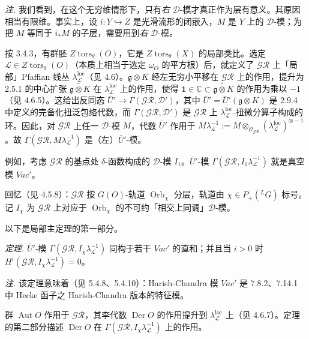  \emph{注.} 我们看到，在这个无穷维情形下，只有\emph{右} $\mathcal{D}$-模才真正作为层有意义。其原因相当有限维。事实上，设 $i:Y\hookrightarrow Z$ 是光滑流形的闭嵌入，$M$ 是 $Y$ 上的 $\mathcal{D}$-模；为把 $M$ 等同于 $i_*M$ 的子层，需要用到\emph{右} $\mathcal{D}$-模。

 按 3.4.3，有群胚 $Z\operatorname{tors}_\theta(O)$，它是 $Z\operatorname{tors}_\theta(X)$ 的局部类比。选定 $\mathcal{L}\in Z\operatorname{tors}_\theta(O)$（本质上相当于选定 $\omega_O$ 的平方根）后，就定义了 $\mathcal{GR}$ 上「局部」Pfaffian 线丛 $\lambda_{\mathcal{L}}^{\operatorname{loc}}$（见 4.6）。$\mathfrak{g}\otimes K$ 经左无穷小平移在 $\mathcal{GR}$ 上的作用，提升为 2.5.1 的中心扩张 $\widetilde{\mathfrak{g}\otimes K}$ 在 $\lambda_{\mathcal{L}}^{\operatorname{loc}}$ 上的作用，使得 $\mathbf{1}\in\mathbb{C}\subset\widetilde{\mathfrak{g}\otimes K}$ 的作用为乘以 $-1$（见 4.6.5）。这给出反同态 $\bar U'\to\Gamma(\mathcal{GR},\mathcal{D}')$，其中 $\bar U'=\bar U'(\mathfrak{g}\otimes K)$ 是 2.9.4 中定义的完备化扭泛包络代数，而 $\Gamma(\mathcal{GR},\mathcal{D}')$ 是 $\mathcal{GR}$ 上 $\lambda_{\mathcal{L}}^{\operatorname{loc}}$-扭微分算子构成的环。因此，对 $\mathcal{GR}$ 上任一 $\mathcal{D}$-模 $M$，代数 $\bar U'$ 作用于 $M\lambda_{\mathcal{L}}^{-1}:=M\otimes_{\mathcal{O}_{\mathcal{GR}}}(\lambda_{\mathcal{L}}^{\operatorname{loc}})^{\otimes -1}$。故 $\Gamma(\mathcal{GR},M\lambda_{\mathcal{L}}^{-1})$ 是（左）$\bar U'$-模。

例如，考虑 $\mathcal{GR}$ 的基点处 $\delta$-函数构成的 $\mathcal{D}$-模 $I_1$。$\bar U'$-模 $\Gamma(\mathcal{GR},I_1\lambda_{\mathcal{L}}^{-1})$ 就是真空模 $Vac'$。

 回忆（见 4.5.8）：$\mathcal{GR}$ 按 $G(O)$-轨道 $\operatorname{Orb}_\chi$ 分层，轨道由 $\chi\in P_+({}^{L}G)$ 标号。记 $I_\chi$ 为 $\mathcal{GR}$ 上对应于 $\overline{\operatorname{Orb}}_\chi$ 的不可约「相交上同调」$\mathcal{D}$-模。

以下是局部主定理的第一部分。

 \emph{定理.} $\bar U'$-模 $\Gamma(\mathcal{GR},I_\chi\lambda_{\mathcal{L}}^{-1})$ 同构于若干 $Vac'$ 的直和；并且当 $i>0$ 时 $H^i(\mathcal{GR},I_\chi\lambda_{\mathcal{L}}^{-1})=0$。


\emph{注.} 该定理意味着（见 5.4.8、5.4.10）：Harish-Chandra 模 $Vac'$ 是 7.8.2、7.14.1 中 Hecke 函子之 Harish-Chandra 版本的特征模。

 群 $\operatorname{Aut}O$ 作用于 $\mathcal{GR}$，其李代数 $\operatorname{Der}O$ 的作用提升到 $\lambda_{\mathcal{L}}^{\operatorname{loc}}$ 上（见 4.6.7）。定理的第二部分描述 $\operatorname{Der}O$ 在 $\Gamma(\mathcal{GR},I_\chi\lambda_{\mathcal{L}}^{-1})$ 上的作用。

